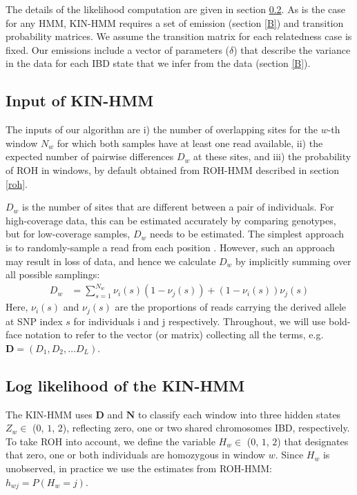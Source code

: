 \documentclass[12pt, letterpaper]{article}
\newcommand{\BD}{\mathbf{D}}
\newcommand{\BN}{\mathbf{N}}
\begin{document}
The details of the likelihood computation are given in section \ref{ll}. As is the case for any HMM, KIN-HMM requires a set of emission (section \ref{B}) and transition probability matrices. We assume the transition matrix for each relatedness case is fixed. Our emissions include a vector of parameters ($\delta$) that describe the variance in the data for each IBD state that we infer from the data (section \ref{B}).

\subsection{Input of KIN-HMM}\label{hmm_input}
The inputs of our algorithm are i) the number of overlapping sites for the $w$-th window $N_w$ for which both samples have at least one read available, ii) the expected number of pairwise differences $D_w$ at these sites, and iii) the probability of ROH in windows, by default obtained from ROH-HMM described in section \ref{roh}.

$D_w$ is the number of sites that are different between a pair of individuals. For high-coverage data, this can be estimated accurately by comparing genotypes, but for low-coverage samples, $D_w$ needs to be estimated. The simplest approach is to  randomly-sample a read from each position \cite{haak_massive_2015,prufer_complete_2014}. However, such an approach may result in loss of data, and hence we calculate $D_w$ by implicitly summing over all possible samplings:
\begin{align}\label{eq:x}
D_w &= \sum_{s=1}^{N_w} \nu_i(s) (1-\nu_j(s)) + (1-\nu_i(s)) \nu_j(s)
\end{align}
Here, $\nu_i(s)$ and $\nu_j(s)$ are the proportions of reads carrying the derived allele at SNP index $s$ for individuals i and j respectively.
Throughout, we will use bold-face notation to refer to the vector (or matrix) collecting  all the terms, e.g. $\BD = (D_1, D_2, \dots D_L)$. 


\subsection{Log likelihood of the KIN-HMM}\label{ll}
The KIN-HMM uses $\BD$ and $\BN$ to classify each window into three hidden states $Z_w \in$ ($0$, $1$, $2$), reflecting zero, one or two shared chromosomes IBD, respectively. To take ROH into account, we define the variable $H_w \in$ ($0$, $1$, $2$) that designates that zero, one or both individuals are homozygous in window $w$. Since $H_w$ is unobserved, in practice we use the estimates from ROH-HMM: $h_{wj} = P(H_w = j)$. 
\end{document}
